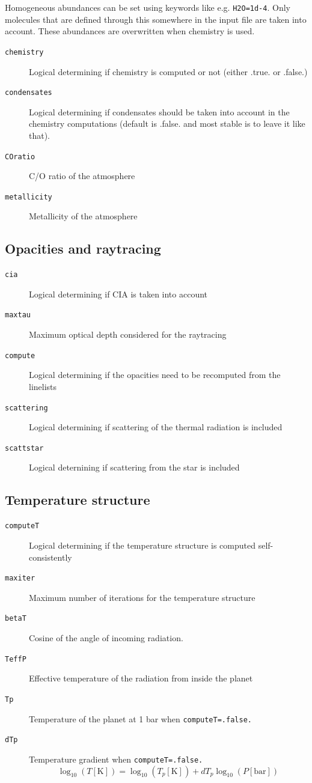 \documentclass[12pt]{article}
\begin{document}
Homogeneous abundances can be set using keywords like e.g. \texttt{H2O=1d-4}. Only molecules that are defined through this somewhere in the input file are taken into account. These abundances are overwritten when chemistry is used.

\begin{description}
\item[\texttt{chemistry}]
Logical determining if chemistry is computed or not (either .true. or .false.)
\item[\texttt{condensates}]
Logical determining if condensates should be taken into account in the chemistry computations (default is .false. and most stable is to leave it like that).
\item[\texttt{COratio}]
C/O ratio of the atmosphere
\item[\texttt{metallicity}]
Metallicity of the atmosphere
\end{description}

\subsection{Opacities and raytracing}

\begin{description}
\item[\texttt{cia}]
Logical determining if CIA is taken into account
\item[\texttt{maxtau}]
Maximum optical depth considered for the raytracing
\item[\texttt{compute}]
Logical determining if the opacities need to be recomputed from the linelists
\item[\texttt{scattering}]
Logical determining if scattering of the thermal radiation is included
\item[\texttt{scattstar}]
Logical deternining if scattering from the star is included
\end{description}

\subsection{Temperature structure}

\begin{description}
\item[\texttt{computeT}]
Logical determining if the temperature structure is computed self-consistently
\item[\texttt{maxiter}]
Maximum number of iterations for the temperature structure
\item[\texttt{betaT}]
Cosine of the angle of incoming radiation.
\item[\texttt{TeffP}]
Effective temperature of the radiation from inside the planet
\item[\texttt{Tp}]
Temperature of the planet at 1 bar when \texttt{computeT=.false.}
\item[\texttt{dTp}]
Temperature gradient when \texttt{computeT=.false.}
\begin{equation}
\log_{10}(T[\mathrm{K}])=\log_{10}(T_p[\mathrm{K}])+dT_p\log_{10}(P[\mathrm{bar}])
\end{equation}
\end{description}
\end{document}
